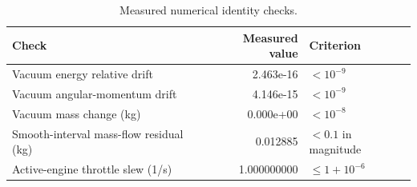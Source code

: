 \begin{table}[htbp]
\centering\small
\caption{Measured numerical identity checks.}
\label{tab:identities}
\begin{tabularx}{\linewidth}{@{}Xrl@{}}
\toprule
Check & Measured value & Criterion \\
\midrule
Vacuum energy relative drift & 2.463e-16 & $<10^{-9}$ \\
Vacuum angular-momentum drift & 4.146e-15 & $<10^{-9}$ \\
Vacuum mass change (kg) & 0.000e+00 & $<10^{-8}$ \\
Smooth-interval mass-flow residual (kg) & 0.012885 & $<0.1$ in magnitude \\
Active-engine throttle slew (1/s) & 1.000000000 & $\le1+10^{-6}$ \\
\bottomrule
\end{tabularx}
\par{}
\end{table}
